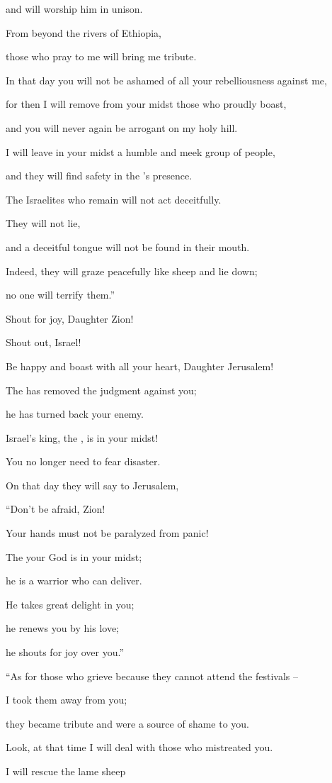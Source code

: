 {\par }{\Q and will worship
him in unison.
\par }{\Q {}From beyond
the rivers
of Ethiopia,
\par }{\Q those who pray to me
will bring
me tribute.
\par }{\Q {}In that day
you will not
be ashamed
of all
your rebelliousness
against me,
\par }{\Q for
then
I will remove
from your midst
those who proudly
boast,

\par }{\Q and you will never
again
be arrogant
on my holy
hill.
\par }{\Q {}I will leave
in your midst
a humble
and meek
group of people,
\par }{\Q and they will find safety in
the
{}’s
presence.
\par }{\Q {}The Israelites
who remain
will not
act
deceitfully.
\par }{\Q They will not
lie,
\par }{\Q and a deceitful
tongue
will not
be found
in their mouth.
\par }{\Q Indeed, they
will graze peacefully like sheep
and lie
down;
\par }{\Q no
one will terrify them.”
\par }{\Q {}Shout
for joy, Daughter
Zion!

\par }{\Q Shout
out, Israel!
\par }{\Q Be happy
and boast
with all
your heart,
Daughter
Jerusalem!
\par }{\Q {}The
{}
has removed
the judgment
against you;

\par }{\Q he has turned
back your enemy.
\par }{\Q Israel’s
king,
the {}, is in your midst!
\par }{\Q You no
longer
need to fear
disaster.
\par }{\Q {}On that day
they will say
to Jerusalem,
\par }{\Q “Don’t
be afraid,
Zion!
\par }{\Q Your hands
must not
be paralyzed from panic!
\par }{\Q {}The
{}
your God
is in your midst;
\par }{\Q he is a warrior
who can deliver.
\par }{\Q He takes great delight
in
you;
\par }{\Q he renews
you by his love;
\par }{\Q he shouts
for joy
over you.”
\par }{\Q {}“As for those who grieve
because they cannot attend
the festivals
–
\par }{\Q I took them away from
you;
\par }{\Q they became
tribute
and were a source of shame to you.
\par }{\Q {}Look,
at that time
I will deal
with those
who mistreated
you.
\par }{\Q I will rescue
the lame
sheep

}
